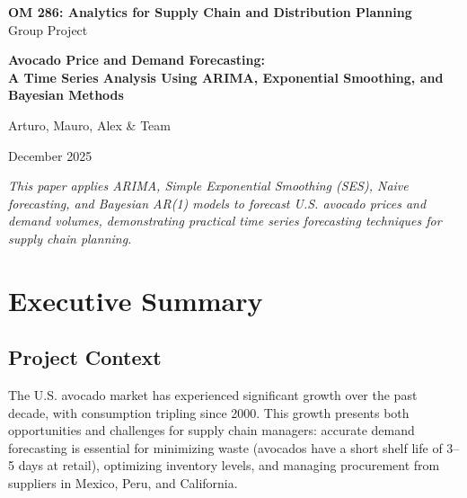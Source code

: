 \documentclass[12pt]{article}
\begin{document}
\begin{titlepage}
    \centering
    \vspace*{2cm}
    
    {\LARGE\bfseries OM 286: Analytics for Supply Chain and Distribution Planning\\[0.5cm]}
    {\Large Group Project\\[2cm]}
    
    {\Huge\bfseries Avocado Price and Demand Forecasting:\\[0.3cm]
    A Time Series Analysis Using ARIMA, Exponential Smoothing, and Bayesian Methods\\[2cm]}
    
    {\Large
    Arturo, Mauro, Alex \& Team\\[1cm]
    }
    
    {\large December 2025\\[3cm]}
    
    \vfill
    
    \textit{This paper applies ARIMA, Simple Exponential Smoothing (SES), Naive forecasting, and Bayesian AR(1) models to forecast U.S. avocado prices and demand volumes, demonstrating practical time series forecasting techniques for supply chain planning.}
    
\end{titlepage}

\newpage
\tableofcontents
\newpage

\section{Executive Summary}
\label{sec:executive-summary}

\subsection{Project Context}

The U.S. avocado market has experienced significant growth over the past decade, with consumption tripling since 2000. This growth presents both opportunities and challenges for supply chain managers: accurate demand forecasting is essential for minimizing waste (avocados have a short shelf life of 3--5 days at retail), optimizing inventory levels, and managing procurement from suppliers in Mexico, Peru, and California.
\end{document}
